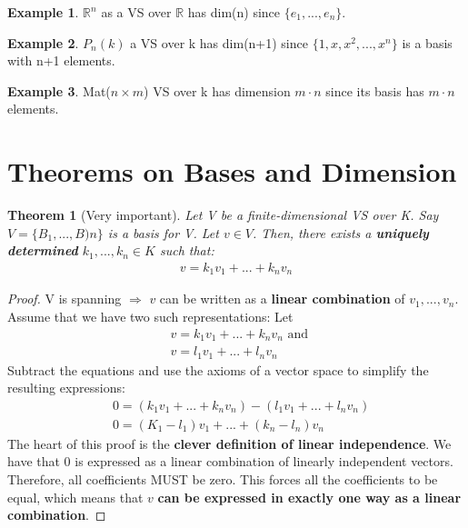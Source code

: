 \documentclass[a4paper, 12pt]{article}
\newtheorem{theorem}{Theorem}
\theoremstyle{definition}
\newtheorem{exmp}{Example}[section]
\theoremstyle{definition}
\theoremstyle{definition}
\theoremstyle{definition}
\begin{document}
{\begin{exmp}
	$\mathbb{R}^n$ as a VS over $\mathbb{R}$ has dim(n) since $\{ e_1,...,e_n \}$. 
\end{exmp}
\begin{exmp}
	$P_n(k)$ a VS over k has dim(n+1) since $\{1,x,x^2,...,x^n \}$ is a basis with n+1 elements. 
\end{exmp}
\begin{exmp}
	Mat($n \times m$) VS over k has dimension $m \cdot n$ since its basis  has $m \cdot n$ elements. 
\end{exmp}

\section{Theorems on Bases and Dimension}

\begin{theorem}[Very important]
	Let V be a finite-dimensional VS over K. Say $V = \{ B_1,...,B)n \}$ is a basis for V. Let $v \in V$. Then, there exists a \textbf{uniquely determined} $k_1,...,k_n \in K$ such that: 
	\begin{align*}
		v = k_1 v_1 + ... + k_n v_n
	\end{align*}
\end{theorem}

\begin{proof}
	V is spanning $\Rightarrow$ $v$ can be written as a \textbf{linear combination} of $v_1,...,v_n$. Assume that we have two such representations: Let
	\begin{align*} 
		& v = k_1 v_1 + ... + k_n v_n \mbox{ and } \\
		& v = l_1 v_1 + ... + l_n v_n 
	\end{align*}
	Subtract the equations and use the axioms of a vector space to simplify the resulting expressions: 
	\begin{align*}
		& 0 = (k_1 v_1 + ... + k_n v_n ) - (l_1 v_1 + ... + l_n v_n ) \\
		& 0 = (K_1 - l_1)v_1 + ... + (k_n - l_n) v_n 
	\end{align*}
	The heart of this proof is the \textbf{clever definition of linear independence}. We have that 0 is expressed as a linear combination of linearly independent vectors. Therefore, all coefficients MUST be zero. This forces all the coefficients to be equal, which means that $v$ \textbf{can be expressed in exactly one way as a linear combination}. 
\end{proof}

}
\end{document}
